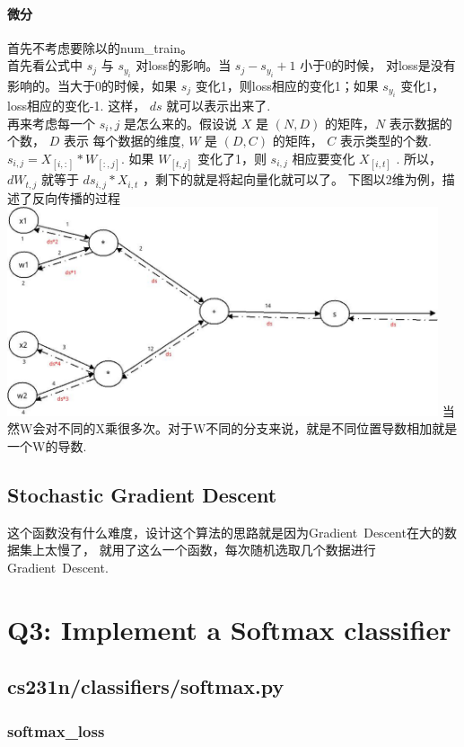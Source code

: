 \documentclass[fontset = none]{ctexart}
\begin{document}
\paragraph{微分}
首先不考虑要除以的num\_train。\\
首先看公式中 $s_j$ 与 $s_{y_i}$ 对loss的影响。当 $s_j - s_{y_i} + 1$ 小于0的时候，
对loss是没有影响的。当大于0的时候，如果 $s_j$ 变化1，则loss相应的变化1；如果 $s_{y_i}$
变化1，loss相应的变化-1. 这样， $ds$ 就可以表示出来了.\\
再来考虑每一个 $s_i,j$ 是怎么来的。假设说 $X$ 是 $(N,D)$ 的矩阵，$N$ 表示数据的个数， $D$ 表示
每个数据的维度, $W$ 是 $(D,C)$ 的矩阵， $C$ 表示类型的个数. $s_{i,j} = X_{[i,:]} * W_{[:,j]}$.
如果 $W_{[t,j]}$ 变化了1，则 $s_{i,j}$ 相应要变化 $X_{[i,t]}$ . 所以， $dW_{t,j}$ 就等于
$ds_{i,j} * X_{i,t}$ ，剩下的就是将起向量化就可以了。
下图以2维为例，描述了反向传播的过程
\includegraphics[width=5in]{./assignment1_pic/svm_loss_vectorized.jpg}
当然W会对不同的X乘很多次。对于W不同的分支来说，就是不同位置导数相加就是一个W的导数.

\subsection{Stochastic Gradient Descent}
这个函数没有什么难度，设计这个算法的思路就是因为Gradient\ Descent在大的数据集上太慢了，
就用了这么一个函数，每次随机选取几个数据进行Gradient\ Descent.


\section{Q3: Implement a Softmax classifier}
\subsection{cs231n/classifiers/softmax.py}
\subsubsection{softmax\_loss}
\end{document}
